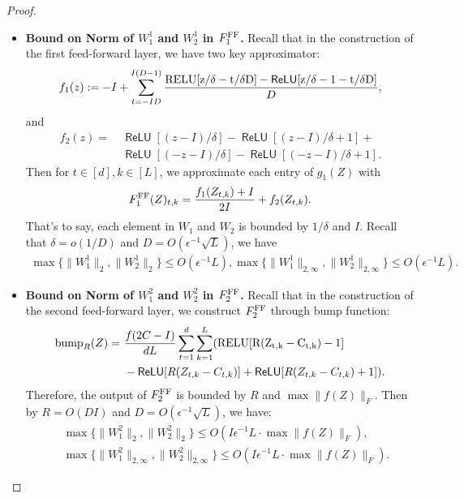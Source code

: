 \documentclass[12pt]{article}
\numberwithin{equation}{section}
\newcommand{\ReLU}{\mathop{\mathsf{ReLU}}}
\theoremstyle{theoremstyle}
\numberwithin{equation}{section}
\numberwithin{theorem}{section}
\numberwithin{proposition}{section}
\numberwithin{definition}{section}
\numberwithin{lemma}{section}
\numberwithin{assumption}{section}
\numberwithin{remark}{section}
\begin{document}
\begin{proof}
\begin{itemize}
\item \textbf{Bound on Norm of $W_1^1$ and $W_2^1$ in $F^{\rm FF}_1$.}
Recall that in the construction of the first feed-forward layer, we have two key approximator:
\begin{align*}
    f_1(z):=-I+\sum_{t=-ID}^{I(D-1)}\frac{\rm RELU[z/\delta-t/\delta D]-\ReLU[z/\delta-1-t/\delta D]}{D},
\end{align*}
and 
\begin{align*}
    f_2(z)= & ~\ReLU[(z-I)/\delta]-\ReLU[(z-I)/\delta+1]+\\
    & ~
    \ReLU[(-z-I)/\delta]-\ReLU[(-z-I)/\delta+1].
\end{align*}
Then for $t\in[d],k\in[L]$, we approximate each entry of $g_1(Z)$ with
\begin{align*}
    F^{\rm FF}_1(Z)_{t,k}=\frac{f_1(Z_{t,k})+I}{2I}+f_2(Z_{t,k}).
\end{align*}
That's to say, each element in $W_1$ and $W_2$ is bounded by $1/\delta$ and $I$.
Recall that $\delta=o(1/D)$ and $D=O(\epsilon^{-1}\sqrt{L})$, we have
\begin{align*}
    \max\{\|W_1^1\|_2,\|W_2^1\|_2\}\leq O(\epsilon^{-1}L),\max\{\|W_1^1\|_{2,\infty},\|W_2^1\|_{2,\infty}\}\leq O(\epsilon^{-1}L).
\end{align*}

\item \textbf{Bound on Norm of $W_1^2$ and $W_2^2$ in $F^{\rm FF}_2$.}
Recall that in the construction of the second feed-forward layer, we construct $F^{\rm FF}_2$ through bump function:
\begin{align*}
    {\rm bump}_R(Z)= & ~\frac{f(2C-I)}{dL}\sum_{t=1}^d\sum_{k=1}^L({\rm RELU[R(Z_{t,k}-C_{t,k})-1]} \\
    & ~ 
    -\ReLU[R(Z_{t,k}-C_{t,k})]+\ReLU[R(Z_{t,k}-C_{t,k})+1]).
\end{align*}
Therefore, the output of $F^{\rm FF}_2$ is bounded by $R$ and $\max\|f(Z)\|_F$.
Then by $R=O(DI)$ and $D=O(\epsilon^{-1}\sqrt{L})$, we have:
\begin{align*}
    & ~\max\{\|W_1^2\|_2,\|W_2^2\|_2\}\leq O(I\epsilon^{-1}L\cdot\max\|f(Z)\|_F), \\
    & ~\max\{\|W_1^2\|_{2,\infty},\|W_2^2\|_{2,\infty}\}\leq O(I\epsilon^{-1}L\cdot\max\|f(Z)\|_F).
\end{align*}


\end{itemize}
\end{proof}
\end{document}
